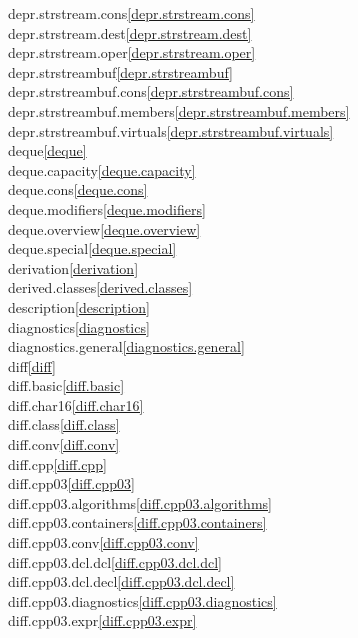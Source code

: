 \begin{multicols}{2}
depr.strstream.cons\quad\ref{depr.strstream.cons}\\
depr.strstream.dest\quad\ref{depr.strstream.dest}\\
depr.strstream.oper\quad\ref{depr.strstream.oper}\\
depr.strstreambuf\quad\ref{depr.strstreambuf}\\
depr.strstreambuf.cons\quad\ref{depr.strstreambuf.cons}\\
depr.strstreambuf.members\quad\ref{depr.strstreambuf.members}\\
depr.strstreambuf.virtuals\quad\ref{depr.strstreambuf.virtuals}\\
deque\quad\ref{deque}\\
deque.capacity\quad\ref{deque.capacity}\\
deque.cons\quad\ref{deque.cons}\\
deque.modifiers\quad\ref{deque.modifiers}\\
deque.overview\quad\ref{deque.overview}\\
deque.special\quad\ref{deque.special}\\
derivation\quad\ref{derivation}\\
derived.classes\quad\ref{derived.classes}\\
description\quad\ref{description}\\
diagnostics\quad\ref{diagnostics}\\
diagnostics.general\quad\ref{diagnostics.general}\\
diff\quad\ref{diff}\\
diff.basic\quad\ref{diff.basic}\\
diff.char16\quad\ref{diff.char16}\\
diff.class\quad\ref{diff.class}\\
diff.conv\quad\ref{diff.conv}\\
diff.cpp\quad\ref{diff.cpp}\\
diff.cpp03\quad\ref{diff.cpp03}\\
diff.cpp03.algorithms\quad\ref{diff.cpp03.algorithms}\\
diff.cpp03.containers\quad\ref{diff.cpp03.containers}\\
diff.cpp03.conv\quad\ref{diff.cpp03.conv}\\
diff.cpp03.dcl.dcl\quad\ref{diff.cpp03.dcl.dcl}\\
diff.cpp03.dcl.decl\quad\ref{diff.cpp03.dcl.decl}\\
diff.cpp03.diagnostics\quad\ref{diff.cpp03.diagnostics}\\
diff.cpp03.expr\quad\ref{diff.cpp03.expr}\\

\end{multicols}
